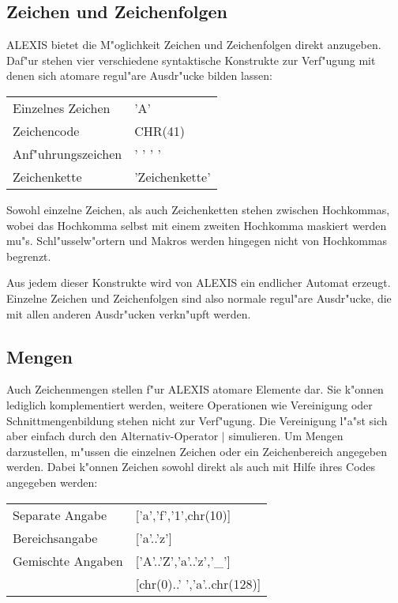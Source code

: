 \subsection{Zeichen und Zeichenfolgen}
ALEXIS bietet die M"oglichkeit Zeichen und Zeichenfolgen direkt anzugeben. Daf"ur stehen vier
verschiedene syntaktische Konstrukte zur Verf"ugung mit denen sich atomare regul"are 
Ausdr"ucke bilden lassen:

\medskip

\begin{tabular}{ll}
Einzelnes Zeichen&'A'\\
Zeichencode&CHR(41)\\
Anf"uhrungszeichen&' ' ' '\\
Zeichenkette&'Zeichenkette'\\
\end{tabular}

\medskip

Sowohl einzelne Zeichen, als auch Zeichenketten stehen zwischen Hochkommas, wobei 
das Hochkomma selbst mit einem zweiten Hochkomma maskiert werden mu"s. 
Schl"usselw"ortern und Makros werden hingegen nicht von Hochkommas begrenzt.

Aus jedem dieser Konstrukte wird von ALEXIS ein endlicher Automat erzeugt. Einzelne Zeichen
und Zeichenfolgen sind also normale regul"are Ausdr"ucke, die mit allen anderen 
Ausdr"ucken verkn"upft werden. 
\subsection{Mengen}
Auch Zeichenmengen stellen f"ur ALEXIS atomare Elemente dar. Sie k"onnen lediglich komplementiert
werden, weitere Operationen wie Vereinigung oder Schnittmengenbildung stehen nicht zur
Verf"ugung. Die Vereinigung l"a"st sich aber einfach durch den Alternativ-Operator $\mid$
simulieren.
\vfill \eject
Um Mengen darzustellen, m"ussen die einzelnen Zeichen oder ein Zeichenbereich angegeben
werden. Dabei k"onnen Zeichen sowohl direkt als auch mit Hilfe ihres Codes angegeben werden:

\medskip

\begin{tabular}{ll}
Separate Angabe&['a','f','1',chr(10)]\\
Bereichsangabe&['a'..'z']\\
Gemischte Angaben&['A'..'Z','a'..'z','\_']\\
&[chr(0)..' ','a'..chr(128)]\\
\end{tabular}

